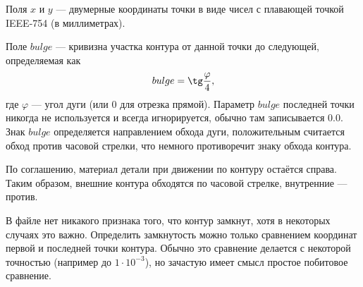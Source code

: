 Поля
$x$ и $y$ ---
двумерные координаты точки в виде
чисел с плавающей точкой  IEEE-754
(в миллиметрах).

Поле
$bulge$ ---
кривизна участка контура от данной точки до следующей,
определяемая как
$$
bulge =
\tg \frac{\varphi}{4}
,
$$
где
$\varphi$ --- угол дуги
(или 0 для отрезка прямой).
Параметр $bulge$
последней точки никогда не используется и всегда игнорируется,
обычно там записывается $0.0$.
Знак
$bulge$
определяется направлением обхода дуги,
положительным считается обход против часовой стрелки,
что немного противоречит знаку обхода контура.

По соглашению,
материал детали при движении по контуру остаётся справа.
Таким образом, внешние контура обходятся по часовой стрелке,
внутренние --- против.

В файле нет никакого признака того,
что контур замкнут,
хотя в некоторых случаях это важно.
Определить замкнутость можно только сравнением координат первой и последней точки контура.
Обычно это сравнение делается с некоторой точностью
(например до $1\cdot 10^{-3}$),
но зачастую имеет смысл простое побитовое сравнение.

